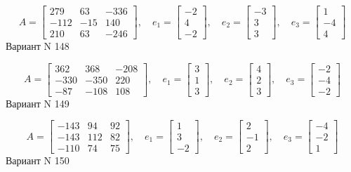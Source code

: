 \documentclass[11pt]{report}
\begin{document}
$$A = \left[\begin{matrix}279 & 63 & -336\\-112 & -15 & 140\\210 & 63 & -246\end{matrix}\right],\quad e_1 = \left[\begin{matrix}-2\\4\\-2\end{matrix}\right],\quad e_2 = \left[\begin{matrix}-3\\3\\3\end{matrix}\right],\quad e_3 = \left[\begin{matrix}1\\-4\\4\end{matrix}\right]$$Вариант N 148

$$A = \left[\begin{matrix}362 & 368 & -208\\-330 & -350 & 220\\-87 & -108 & 108\end{matrix}\right],\quad e_1 = \left[\begin{matrix}3\\1\\3\end{matrix}\right],\quad e_2 = \left[\begin{matrix}4\\2\\3\end{matrix}\right],\quad e_3 = \left[\begin{matrix}-2\\-4\\-2\end{matrix}\right]$$Вариант N 149

$$A = \left[\begin{matrix}-143 & 94 & 92\\-143 & 112 & 82\\-110 & 74 & 75\end{matrix}\right],\quad e_1 = \left[\begin{matrix}1\\3\\-2\end{matrix}\right],\quad e_2 = \left[\begin{matrix}2\\-1\\2\end{matrix}\right],\quad e_3 = \left[\begin{matrix}-4\\-2\\1\end{matrix}\right]$$Вариант N 150
\end{document}
